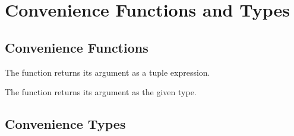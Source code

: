 %
%
%
%

\chapter{Convenience Functions and Types}

\section{Convenience Functions}



The function  returns its argument as a tuple expression.



The function  returns its argument as the given type.


\section{Convenience Types}

